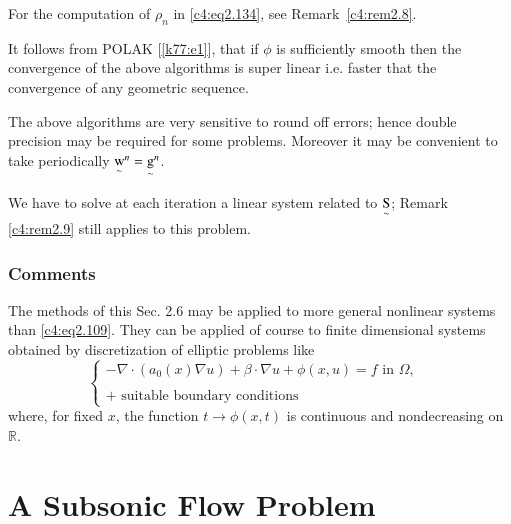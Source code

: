 \begin{remark}\label{c4:rem2.17}%
For the computation of $\rho_n$ in \eqref{c4:eq2.134}, see
Remark~\ref{c4:rem2.8}. 
\end{remark}

\begin{remark}\label{c4:rem2.18}%
  It follows from POLAK [\ref{k77:e1}], that if $\phi$ is sufficiently smooth
  then the convergence of the above algorithms is super linear
  i.e. faster that the convergence of any geometric sequence. 
\end{remark}

\begin{remark}\label{c4:rem2.19}%
The above algorithms are very sensitive to round off errors; hence
double precision may be required for some problems. Moreover it may be
convenient to take periodically ${\operatorname*{w}\limits_\sim}^{n}=
{\operatorname*{g}\limits_\sim}^{n}$. 
\end{remark}

\begin{remark}\label{c4:rem2.20}%
We have to solve at each iteration a linear system related to
$\operatorname*{S}\limits_\sim$; Remark \ref{c4:rem2.9} still applies to this
problem. 
\end{remark}

\subsubsection{Comments}\label{c4:sss2.6.8} 
The methods of this Sec. 2.6 may be applied to more general nonlinear
systems than \eqref{c4:eq2.109}. They can be applied of course to
finite dimensional systems obtained by discretization of elliptic
problems like  
\begin{equation*}
\begin{cases}
-\nabla \cdot (a_0 (x)\nabla u) + \beta \cdot \nabla u + \phi (x, u) =
f \text{ in } \Omega, \\ 
&\\
+ \text{ suitable boundary conditions }
\end{cases}
\end{equation*}
where, for fixed $x$, the function $t \to \phi (x, t)$ is continuous
and nondecreasing on $\mathbb{R}$. 

\section{A Subsonic Flow Problem}\label{c4:s3}

